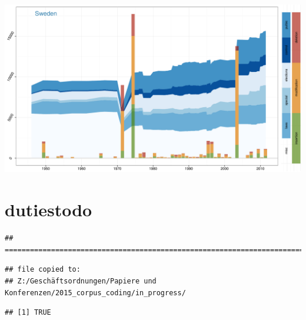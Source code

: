 \documentclass[a4paper, landscape]{article}
\begin{document}
\includegraphics{country_graphs_files/figure-latex/unnamed-chunk-3-16.pdf}

\pagebreak{}

\section{dutiestodo}\label{dutiestodo}

\begin{verbatim}
## ==========================================================================
\end{verbatim}

\begin{verbatim}
## file copied to: 
## Z:/Geschäftsordnungen/Papiere und Konferenzen/2015_corpus_coding/in_progress/
\end{verbatim}

\begin{verbatim}
## [1] TRUE
\end{verbatim}
\end{document}
